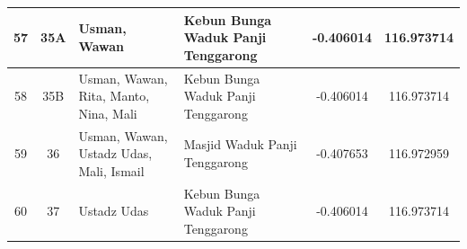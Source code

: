 \begin{landscape}
{\begin{tabularx}{\textwidth}{|c|c|l|l|c|c|}
            57 & 35A            & Usman, Wawan                                                 & Kebun Bunga Waduk Panji Tenggarong & -0.406014         & 116.973714         \\ \hline
            58 & 35B            & Usman, Wawan, Rita, Manto, Nina, Mali                        & Kebun Bunga Waduk Panji Tenggarong & -0.406014         & 116.973714         \\ \hline
            59 & 36             & Usman, Wawan, Ustadz Udas, Mali, Ismail                      & Masjid Waduk Panji Tenggarong      & -0.407653         & 116.972959         \\ \hline
            60 & 37             & Ustadz Udas                                                  & Kebun Bunga Waduk Panji Tenggarong & -0.406014         & 116.973714         \\ \hline
        \end{tabularx}
    }
\end{landscape}

\pagebreak

